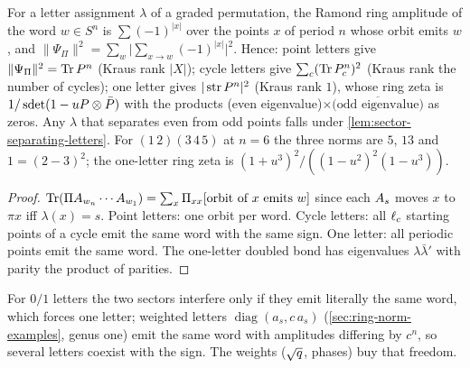 \begin{proposition}
\label{prop:letters-word-formula}
For a letter assignment $\lambda$ of a graded permutation, the Ramond ring amplitude of the word
$w\in S^n$ is $\sum(-1)^{|x|}$ over the points $x$ of period $n$ whose orbit emits $w$, and
$\|\Psi_\Pi\|^2 = \sum_w\bigl|\sum_{x\to w}(-1)^{|x|}\bigr|^2$. Hence: point letters give
$\|\Psi_\Pi\|^2 = \operatorname{Tr} P^n$ (Kraus rank $|X|$); cycle letters give $\sum_c(\operatorname{Tr} P_c^n)^2$ (Kraus rank
the number of cycles); one letter gives $|\operatorname{str} P^n|^2$ (Kraus rank $1$), whose ring zeta is
$1/\operatorname{sdet}(1-uP\otimes\bar P)$ with the products (even eigenvalue)$\times\overline{\text{(odd eigenvalue)}}$
as zeros. Any $\lambda$ that separates even from odd points falls under
\cref{lem:sector-separating-letters}. For $(1\,2)(3\,4\,5)$ at $n = 6$ the three norms are
$5$, $13$ and $1 = (2-3)^2$; the one-letter ring zeta is $(1+u^3)^2/((1-u^2)^2(1-u^3))$.
\end{proposition}

\begin{proof}
$\operatorname{Tr}(\Pi A_{w_n}\cdots A_{w_1}) = \sum_x\Pi_{xx}[\text{orbit of }x\text{ emits }w]$ since each
$A_{s}$ moves $x$ to $\pi x$ iff $\lambda(x) = s$. Point letters: one orbit per word. Cycle
letters: all $\ell_c$ starting points of a cycle emit the same word with the same sign. One letter:
all periodic points emit the same word. The one-letter doubled bond has eigenvalues
$\lambda\bar\lambda'$ with parity the product of parities.
\end{proof}

For $0/1$ letters the two sectors interfere only if they emit literally the same word, which forces
one letter; weighted letters $\operatorname{diag}(a_s, c\,a_s)$ (\cref{sec:ring-norm-examples}, genus one)
emit the same word with amplitudes differing by $c^n$, so several letters coexist with the sign. The
weights ($\sqrt{q}$, phases) buy that freedom.

